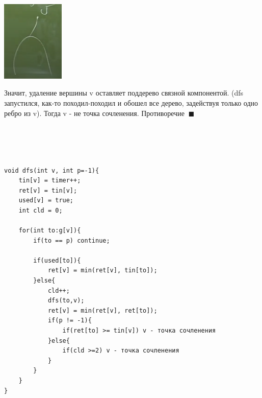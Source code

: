 \begin{center}
    \includegraphics[width=3cm]{images/37_alg24.PNG}
\end{center}
Значит, удаление вершины v оставляет поддерево связной компонентой. (dfs запустился, как-то походил-походил и обошел все дерево, задействуя только одно ребро из v). Тогда v - не точка сочленения. Противоречие $\ \blacksquare$
\\
\\
\\
\\
\\
\begin{verbatim}
void dfs(int v, int p=-1){
    tin[v] = timer++;
    ret[v] = tin[v];
    used[v] = true;
    int cld = 0;
    
    for(int to:g[v]){
        if(to == p) continue;
        
        if(used[to]){
            ret[v] = min(ret[v], tin[to]);
        }else{
            cld++;
            dfs(to,v);
            ret[v] = min(ret[v], ret[to]);
            if(p != -1){
                if(ret[to] >= tin[v]) v - точка сочленения
            }else{
                if(cld >=2) v - точка сочленения
            }
        }
    }
}
\end{verbatim}